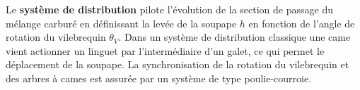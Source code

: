 \documentclass[10pt,fleqn]{article} %
\begin{document}
\begin{multicols}{2}
%
%
%
%
%
%
%
%
%




Le \textbf{système de distribution} pilote l'évolution de la section de passage du mélange carburé en définissant la levée de la soupape \og $h$ \fg{} en fonction de l'angle de rotation du vilebrequin $\theta_{V}$. Dans un système de distribution classique une came vient actionner un linguet par l'intermédiaire d'un galet, ce qui permet le déplacement de la soupape. La synchronisation de la rotation du vilebrequin et des arbres à cames est assurée par un système de type poulie-courroie.

 


\end{multicols}
\end{document}
